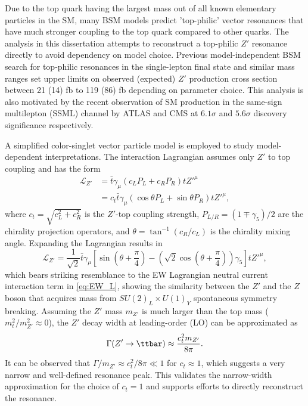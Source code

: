 \documentclass[../thesis.tex]{subfiles}
\begin{document}
Due to the top quark having the largest mass out of all known elementary particles in the \acs{SM}, many \acs{BSM} models \citep{Darm__2021,Craig:2015jba,Craig_2017,Branco:2011iw,PhysRevD.93.075038,higgscomp,theory:ttZp_LHC,theory:Zp_topphilic} predict 'top-philic' vector resonances that have much stronger coupling to the top quark compared to other quarks. The analysis in this dissertation attempts to reconstruct a top-philic $Z'$ resonance directly to avoid dependency on model choice. Previous model-independent \acs{BSM} \tttt search for top-philic resonances \citep{theory:ttZp_1los} in the single-lepton final state and similar mass ranges set upper limits on observed (expected) $Z'$ production cross section between 21 (14) fb to 119 (86) fb depending on parameter choice. This analysis is also motivated by the recent observation of \acs{SM} \tttt production in the same-sign multilepton (\acs{SSML}) channel by ATLAS \citep{tttt_obs} and CMS \citep{tttt_obs_cms} at $6.1\sigma$ and $5.6\sigma$ discovery significance respectively.

A simplified color-singlet vector particle model \citep{theory:ttZp,theory:ttZp_LHC} is employed to study model-dependent interpretations. The interaction Lagrangian assumes only $Z'$ to top coupling and has the form
\begin{equation}
\begin{aligned}
\mathcal{L}_{Z'} &= \bar{t}\gamma_\mu\left(c_L P_L + c_R P_R\right) tZ'^{\mu}\\
&= c_t \bar{t}\gamma_\mu\left(\cos\theta P_L + \sin\theta P_R\right) tZ'^{\mu},
\end{aligned}
\end{equation}
where $c_t=\sqrt{c_L^2+c_R^2}$ is the $Z'$-top coupling strength, $P_{L/R}=(1\mp \gamma_5)/2$ are the chirality projection operators, and $\theta = \tan^{-1}(c_R/c_L)$ is the chirality mixing angle. Expanding the Lagrangian results in
\begin{equation}
\mathcal{L}_{Z'} = \frac{1}{\sqrt{2}}\bar{t}\gamma_\mu\left[
\sin\left(\theta+\frac{\pi}{4}\right) - \left(\sqrt{2}\cos\left(\theta+\frac{\pi}{4}\right)\right)\gamma_5
\right] tZ'^{\mu},
\end{equation}
which bears striking resemblance to the \acs{EW} Lagrangian neutral current interaction term in \autoref{eq:EW_L}, showing the similarity between the $Z'$ and the $Z$ boson that acquires mass from $SU(2)_L\times U(1)_Y$ spontaneous symmetry breaking. Assuming the $Z'$ mass $m_{Z'}$ is much larger than the top mass ($m_t^2/m_{Z'}^2 \approx 0$), the $Z'$ decay width at leading-order (\acs{LO}) can be approximated as
\begin{equation}
\Gamma(Z' \rightarrow \ttbar) \approx \frac{c_t^2 m_{Z'}}{8\pi}.
\end{equation}
It can be observed that $\Gamma/m_{Z'} \approx c_t^2/8\pi \ll 1$ for $c_t\approx 1$, which suggests a very narrow and well-defined resonance peak. This validates the narrow-width approximation for the choice of $c_t=1$ and supports efforts to directly reconstruct the resonance.
\end{document}
